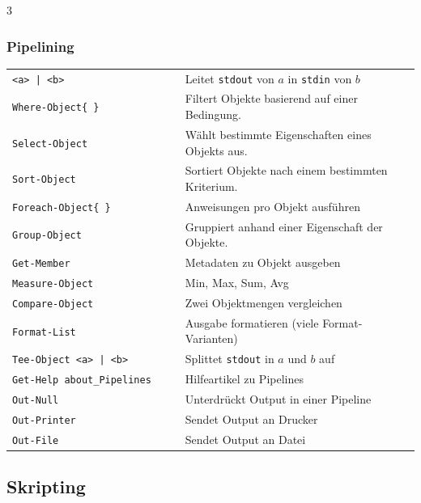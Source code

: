 \documentclass[
11pt,
footheight=40pt
]{scrartcl}
\newif\ifexcitingstuff \excitingstufftrue
\begin{document}
\begin{paracol}{3}
	\subsubsection*{Pipelining}
	\begin{tabular}{p{0.42\linewidth} p{0.58\linewidth}}
		\rowcolor{lightgreen} \texttt{<a> | <b>} & Leitet \texttt{stdout} von $a$ in \texttt{stdin} von $b$ \\
	    \texttt{Where-Object\{ \}} & Filtert Objekte basierend auf einer Bedingung. \\
	    \rowcolor{lightgreen} \texttt{Select-Object} & Wählt bestimmte Eigenschaften eines Objekts aus. \\
	    \texttt{Sort-Object} & Sortiert Objekte nach einem bestimmten Kriterium. \\
	    \rowcolor{lightgreen} \texttt{Foreach-Object\{ \}} & Anweisungen pro Objekt ausführen \\
	    \texttt{Group-Object} & Gruppiert anhand einer Eigenschaft der Objekte. \\
	    \rowcolor{lightgreen} \texttt{Get-Member} & Metadaten zu Objekt ausgeben \\
	    \texttt{Measure-Object} & Min, Max, Sum, Avg \\
	    \rowcolor{lightgreen} \texttt{Compare-Object} & Zwei Objektmengen vergleichen \\
	    \texttt{Format-List} & Ausgabe formatieren (viele Format-Varianten) \\
	    \rowcolor{lightgreen} \texttt{Tee-Object <a> | <b>} & Splittet \texttt{stdout} in $a$ und $b$ auf \\
	    \texttt{Get-Help about\_Pipelines} & Hilfeartikel zu Pipelines \\ \hline
	    \rowcolor{lightgreen} \texttt{Out-Null} & Unterdrückt Output in einer Pipeline \\
	    \texttt{Out-Printer} & Sendet Output an  Drucker \\
	    \rowcolor{lightgreen} \texttt{Out-File} & Sendet Output an Datei \\
	\end{tabular}
	\fi
	
	\newpage
    \switchcolumn[0] %
     
    	\subsection*{Skripting}
   	\ifexcitingstuff 

\end{paracol}
\end{document}
